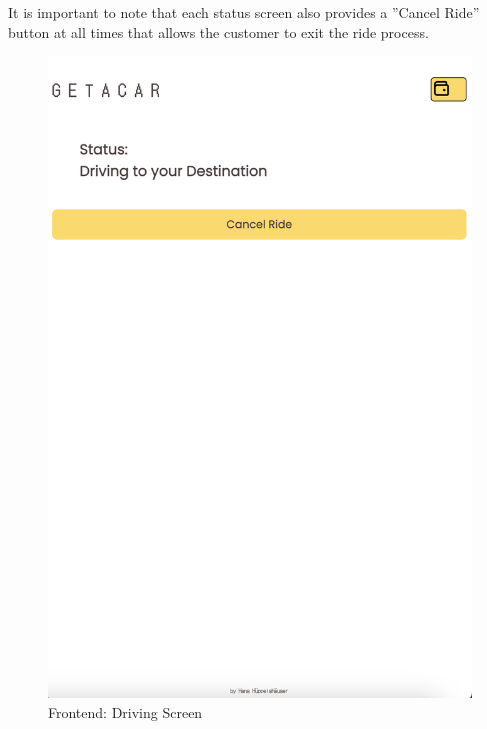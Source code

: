 It is important to note that each status screen also provides a ''Cancel Ride'' button at all times that allows the customer to exit the ride process.

\begin{figure}[H]
    \centering
    
    \begin{minipage}{0.45\linewidth}
        \centering
        \includegraphics[width=\linewidth]{data/ffss/9.png}
        \caption{Frontend: Driving Screen}
        \label{fig:DrivingScreen}
    \end{minipage}
    \hfill
    \begin{minipage}{0.45\linewidth}
        \centering

\end{minipage}
\end{figure}

